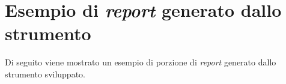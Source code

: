 \chapter{Esempio di \textit{report} generato dallo strumento}

Di seguito viene mostrato un esempio di porzione di \textit{report} generato dallo strumento sviluppato.

